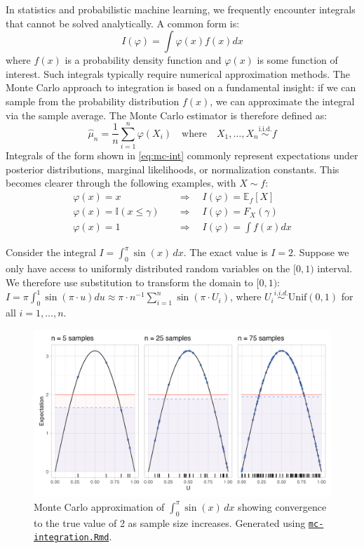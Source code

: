 In statistics and probabilistic machine learning, we frequently encounter integrals that cannot be solved analytically. A common form is:
\begin{equation}
\label{eq:mc-int}
I(\varphi) = \int \varphi(x)f(x) dx
\end{equation}
where $f(x)$ is a probability density function and $\varphi(x)$ is some function of interest.
Such integrals typically require numerical approximation methods.
The Monte Carlo approach to integration is based on a fundamental insight: if we can sample from the probability distribution $f(x)$, we can approximate the integral via the sample average. The Monte Carlo estimator is therefore defined as:
\begin{equation}
\label{eq:mc-estimator}
\hat{\mu}_n = \frac{1}{n} \sum_{i=1}^n \varphi(X_i) \quad \text{where} \quad X_1, \ldots, X_n \overset{\text{i.i.d.}}{\sim} f
\end{equation}
Integrals of the form shown in \eqref{eq:mc-int} commonly represent expectations under posterior distributions, marginal likelihoods, or normalization constants. This becomes clearer through the following examples, with $X \sim f$:
\begin{align*}
\varphi(x) = x &\quad \Rightarrow \quad I(\varphi) = \mathbb{E}_f[X] \\
\varphi(x) = \mathbb{I}(x \leq \gamma) &\quad \Rightarrow \quad I(\varphi) = F_X(\gamma) \\
\varphi(x) = 1 &\quad \Rightarrow \quad I(\varphi) = \int f(x)dx
\end{align*}

\begin{example}
\label{ex:sin}
    Consider the integral $I = \int_0^{\pi} \sin(x)\,dx$. The exact value is $I = 2$.
    Suppose we only have access to uniformly distributed random variables on the $[0, 1)$ interval.
    We therefore use substitution to transform the domain to $[0,1)$: $I = \pi \int_0^1 \sin(\pi \cdot u) du \approx \pi \cdot n^{-1} \sum_{i = 1}^n \sin(\pi \cdot U_i)$, where $U_i \overset{i.i.d.}{\sim} \text{Unif}(0,1)$ for all $i = 1,...,n$.
    
    \begin{figure}[h]
    \centering
    \includegraphics[width=.8\linewidth]{figures/mc-integration1.png}
    \caption{Monte Carlo approximation of $\int_0^{\pi} \sin(x)\,dx$ showing convergence to the true value of 2 as sample size increases. Generated using \href{https://github.com/NikoGerman/Seminar/blob/main/Notebooks/mc-integration.Rmd}{\texttt{mc-integration.Rmd}}.}
    \label{fig:mc-integration1}
\end{figure}
\end{example}

